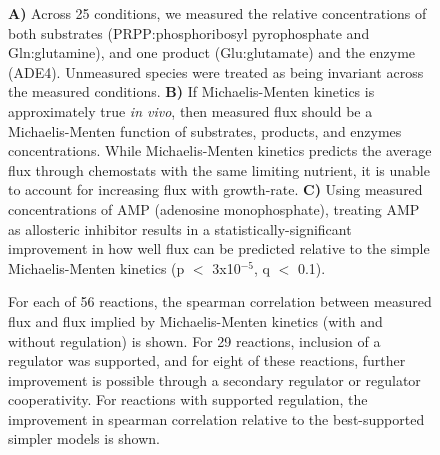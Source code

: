\begin{figure}
\caption[Two models of PRPP Amidotransferase (PPAT) kinetics are compared: reversible Michaelis-Menten kinetics with and without allosteric inhibition by AMP.]{ \textbf{A)} Across 25 conditions, we measured the relative concentrations of both substrates (PRPP:phosphoribosyl pyrophosphate and Gln:glutamine), and one product (Glu:glutamate) and the enzyme (ADE4). Unmeasured species were treated as being invariant across the measured conditions. \textbf{B)} If Michaelis-Menten kinetics is approximately true \textit{in vivo}, then measured flux should be a Michaelis-Menten function of substrates, products, and enzymes concentrations.  While Michaelis-Menten kinetics predicts the average flux through chemostats with the same limiting nutrient, it is unable to account for increasing flux with growth-rate.  \textbf{C)} Using measured concentrations of AMP (adenosine monophosphate), treating AMP as allosteric inhibitor results in a statistically-significant improvement in how well flux can be predicted relative to the simple Michaelis-Menten kinetics (p $<$ 3x10$^{-5}$, q $<$ 0.1).}
\end{figure}

\begin{figure}
\caption[Metabolism-wide summary of the consistency between measured flux and Michaelis-Menten predictions.]{ For each of 56 reactions, the spearman correlation between measured flux and flux implied by Michaelis-Menten kinetics (with and without regulation) is shown.  For 29 reactions, inclusion of a regulator was supported, and for eight of these reactions, further improvement is possible through a secondary regulator or regulator cooperativity.  For reactions with supported regulation, the improvement in spearman correlation relative to the best-supported simpler models is shown.}
\end{figure}

